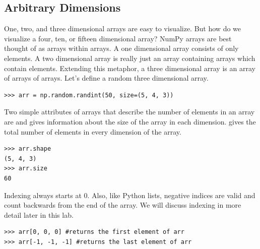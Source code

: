 \subsection*{Arbitrary Dimensions}
One, two, and three dimensional arrays are easy to visualize.
But how do we visualize a four, ten, or fifteen dimensional array?
NumPy arrays are best thought of as arrays within arrays.
A one dimensional array consists of only elements.
A two dimensional array is really just an array containing arrays which contain elements.
Extending this metaphor, a three dimensional array is an array of arrays of arrays.
Let's define a random three dimensional array.
\begin{lstlisting}
>>> arr = np.random.randint(50, size=(5, 4, 3))
\end{lstlisting}
Two simple attributes of arrays that describe the number of elements in an array are  and 
 gives information about the size of the array in each dimension.
 gives the total number of elements in every dimension of the array.
\begin{lstlisting}
>>> arr.shape
(5, 4, 3)
>>> arr.size
60
\end{lstlisting}
Indexing always starts at $0$.
Also, like Python lists, negative indices are valid and count backwards from the end of the array.
We will discuss indexing in more detail later in this lab.
\begin{lstlisting}
>>> arr[0, 0, 0] #returns the first element of arr
>>> arr[-1, -1, -1] #returns the last element of arr
\end{lstlisting}

